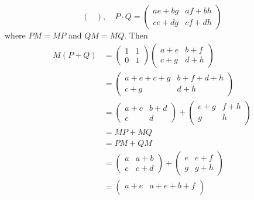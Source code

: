 \begin{problems}
\begin{sol}
\[\begin{pmatrix}
        \end{pmatrix}, \quad P \cdot Q = 
        \begin{pmatrix}
            ae + bg & af + bh \\
            ce + dg & cf + dh
        \end{pmatrix}\]
        where $PM = MP$ and $QM = MQ$. Then
        \begin{align*}
            M(P + Q) & = 
            \begin{pmatrix}
                1 & 1 \\
                0 & 1
            \end{pmatrix}
            \begin{pmatrix}
                a + e & b + f \\
                c + g & d + h
            \end{pmatrix} \\
            & = 
            \begin{pmatrix}
                a + e + c + g & b + f + d + h \\
                c + g & d + h
            \end{pmatrix} \\
            & = 
            \begin{pmatrix}
                a + c & b + d \\
                c & d
            \end{pmatrix} + 
            \begin{pmatrix}
                e + g & f + h \\
                g & h
            \end{pmatrix} \\
            & = MP + MQ \\
            & = PM + QM \\
            & = 
            \begin{pmatrix}
                a & a + b \\
                c & c + d
            \end{pmatrix} + 
            \begin{pmatrix}
                e & e + f \\
                g & g + h
            \end{pmatrix} \\
            & = 
            \begin{pmatrix}
                a + e & a + e + b + f \\

\end{pmatrix}
\end{align*}
\end{sol}
\end{problems}
